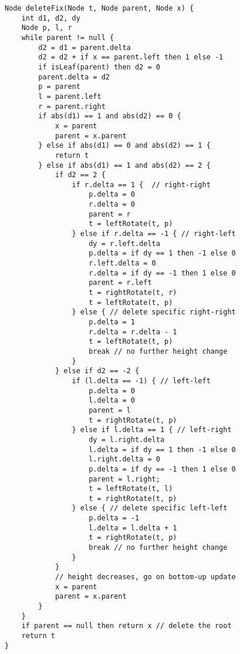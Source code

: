 \documentclass[b5paper]{article}
\begin{document}
\begin{lstlisting}[language = Bourbaki]
Node deleteFix(Node t, Node parent, Node x) {
    int d1, d2, dy
    Node p, l, r
    while parent != null {
        d2 = d1 = parent.delta
        d2 = d2 + if x == parent.left then 1 else -1
        if isLeaf(parent) then d2 = 0
        parent.delta = d2
        p = parent
        l = parent.left
        r = parent.right
        if abs(d1) == 1 and abs(d2) == 0 {
            x = parent
            parent = x.parent
        } else if abs(d1) == 0 and abs(d2) == 1 {
            return t
        } else if abs(d1) == 1 and abs(d2) == 2 {
            if d2 == 2 {
                if r.delta == 1 {  // right-right
                    p.delta = 0
                    r.delta = 0
                    parent = r
                    t = leftRotate(t, p)
                } else if r.delta == -1 { // right-left
                    dy = r.left.delta
                    p.delta = if dy == 1 then -1 else 0
                    r.left.delta = 0
                    r.delta = if dy == -1 then 1 else 0
                    parent = r.left
                    t = rightRotate(t, r)
                    t = leftRotate(t, p)
                } else { // delete specific right-right
                    p.delta = 1
                    r.delta = r.delta - 1
                    t = leftRotate(t, p)
                    break // no further height change
                }
            } else if d2 == -2 {
                if (l.delta == -1) { // left-left
                    p.delta = 0
                    l.delta = 0
                    parent = l
                    t = rightRotate(t, p)
                } else if l.delta == 1 { // left-right
                    dy = l.right.delta
                    l.delta = if dy == 1 then -1 else 0
                    l.right.delta = 0
                    p.delta = if dy == -1 then 1 else 0
                    parent = l.right;
                    t = leftRotate(t, l)
                    t = rightRotate(t, p)
                } else { // delete specific left-left
                    p.delta = -1
                    l.delta = l.delta + 1
                    t = rightRotate(t, p)
                    break // no further height change
                }
            }
            // height decreases, go on bottom-up update
            x = parent
            parent = x.parent
        }
    }
    if parent == null then return x // delete the root
    return t
}
\end{lstlisting}

\ifx\wholebook\relax \else


\end{document}
